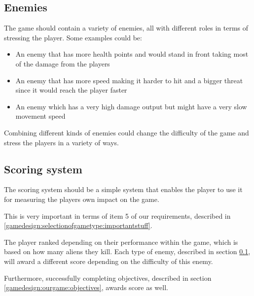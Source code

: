 \subsection{Enemies}\label{gamedesign:ourgame:enemies}
The game should contain a variety of enemies, all with different roles in terms of stressing the player.
Some examples could be:
\begin{itemize}
\item An enemy that has more health points and would stand in front taking most of the damage from the players
\item An enemy that has more speed making it harder to hit and a bigger threat since it would reach the player faster
\item An enemy which has a very high damage output but might have a very slow movement speed
\end{itemize}
Combining different kinds of enemies could change the difficulty of the game and stress the players in a variety of ways.

\subsection{Scoring system}\label{gamedesign:ourgame:scoring}
The scoring system should be a simple system that enables the player to use it for measuring the players own impact on the game.

This is very important in terms of item 5 of our requirements, described in \ref{gamedesign:selectionofgametype:importantstuff}.

The player ranked depending on their performance within the game, which is based on how many aliens they kill.
Each type of enemy, described in section \ref{gamedesign:ourgame:enemies}, will award a different score depending on the difficulty of this enemy.

Furthermore, successfully completing objectives, described in section \ref{gamedesign:ourgame:objectives}, awards score as well.
